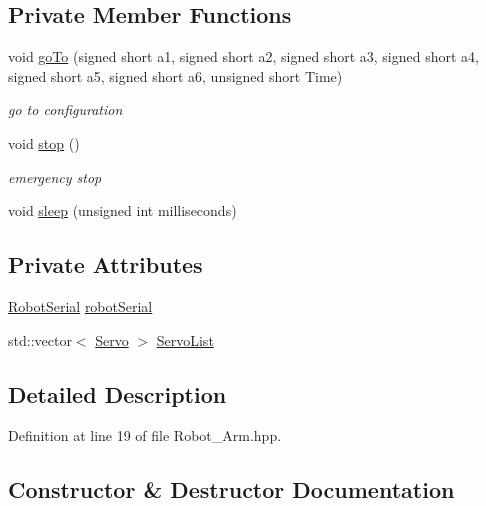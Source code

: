 \subsection*{Private Member Functions}
\begin{DoxyCompactItemize}
\item 
void \hyperlink{class_robot_arm_ae60423b7c1c23bb098e889953499007b}{go\+To} (signed short a1, signed short a2, signed short a3, signed short a4, signed short a5, signed short a6, unsigned short Time)
\begin{DoxyCompactList}\small\item\em go to configuration \end{DoxyCompactList}\item 
void \hyperlink{class_robot_arm_abd7be4339ad5fe6c65b07b4930f52e69}{stop} ()
\begin{DoxyCompactList}\small\item\em emergency stop \end{DoxyCompactList}\item 
void \hyperlink{class_robot_arm_a44429d55c7c90ec6c827766c91ea1c1f}{sleep} (unsigned int milliseconds)
\end{DoxyCompactItemize}
\subsection*{Private Attributes}
\begin{DoxyCompactItemize}
\item 
\hyperlink{class_robot_serial}{Robot\+Serial} \hyperlink{class_robot_arm_aa1be826408c3c876e2227095bba1cd17}{robot\+Serial}
\item 
std\+::vector$<$ \hyperlink{struct_servo}{Servo} $>$ \hyperlink{class_robot_arm_a2fd2d1c096f1b147b7882d7bfd202eaf}{Servo\+List}
\end{DoxyCompactItemize}


\subsection{Detailed Description}


Definition at line 19 of file Robot\+\_\+\+Arm.\+hpp.



\subsection{Constructor \& Destructor Documentation}
